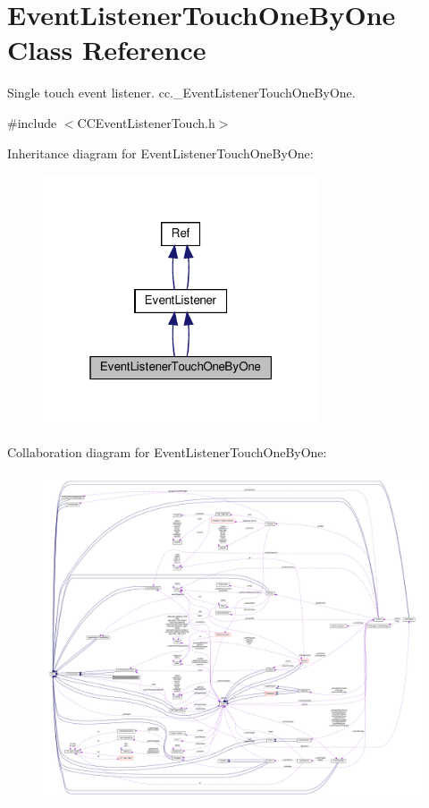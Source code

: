 \hypertarget{classEventListenerTouchOneByOne}{}\section{Event\+Listener\+Touch\+One\+By\+One Class Reference}
\label{classEventListenerTouchOneByOne}


Single touch event listener.  cc.\+\_\+\+Event\+Listener\+Touch\+One\+By\+One.  




{\ttfamily \#include $<$C\+C\+Event\+Listener\+Touch.\+h$>$}



Inheritance diagram for Event\+Listener\+Touch\+One\+By\+One\+:
\nopagebreak
\begin{figure}[H]
\begin{center}
\leavevmode
\includegraphics[width=232pt]{classEventListenerTouchOneByOne__inherit__graph}
\end{center}
\end{figure}


Collaboration diagram for Event\+Listener\+Touch\+One\+By\+One\+:
\nopagebreak
\begin{figure}[H]
\begin{center}
\leavevmode
\includegraphics[width=350pt]{classEventListenerTouchOneByOne__coll__graph}
\end{center}
\end{figure}

